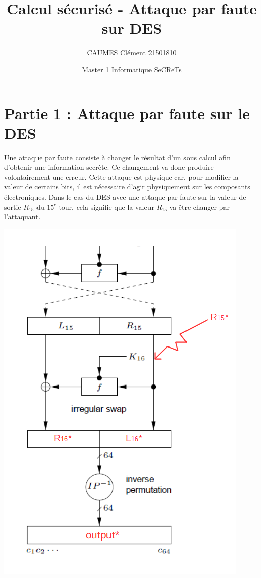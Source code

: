 \documentclass[11pt]{article}
\title{\huge{\textbf Calcul sécurisé - Attaque par faute sur DES}}
\author{CAUMES Clément 21501810}
\date{Master 1 Informatique SeCReTs}
\begin{document}
\maketitle
\vspace{20em}
\newpage

\tableofcontents
\newpage

\section{Partie 1 : Attaque par faute sur le DES}

Une attaque par faute consiste à changer le résultat d'un sous calcul afin d'obtenir une information secrète. Ce changement va donc produire volontairement une erreur. Cette attaque est physique car, pour modifier la valeur de certains bits, il est nécessaire d'agir physiquement sur les composants électroniques. 
Dans le cas du DES avec une attaque par faute sur la valeur de sortie $R_{15}$ du $15^{e}$ tour, cela signifie que la valeur $R_{15}$ va être changer par l'attaquant. 

\begin{center}\includegraphics[scale=0.6]{../pictures/fauteR15.png}\end{center}
\end{document}
